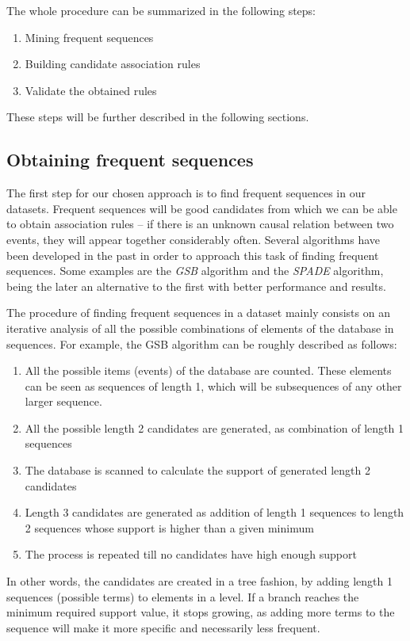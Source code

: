 \documentclass[a4paper,12pt]{article}
\begin{document}
The whole procedure can be summarized in the following steps:
\begin{enumerate}
\item Mining frequent sequences
\item Building candidate association rules
\item Validate the obtained rules
\end{enumerate}

These steps will be further described in the following sections.

\subsection{Obtaining frequent sequences}
\label{sec:mining_sequences}
The first step for our chosen approach is to find frequent sequences in our datasets. Frequent sequences will be good candidates from which we can be able to obtain association rules -- if there is an unknown causal relation between two events, they will appear together considerably often. Several algorithms have been developed in the past in order to approach this task of finding frequent sequences. Some examples are the \emph{GSB} algorithm and the \emph{SPADE} algorithm, being the later an alternative to the first with better performance and results.

The procedure of finding frequent sequences in a dataset mainly consists on an iterative analysis of all the possible combinations of elements of the database in sequences. For example, the GSB algorithm can be roughly described as follows:

\begin{enumerate}
\item All the possible items (events) of the database are counted. These elements can be seen as sequences of length 1, which will be subsequences of any other larger sequence.
\item All the possible length 2 candidates are generated, as combination of length 1 sequences
\item The database is scanned to calculate the support of generated length 2 candidates
\item Length 3 candidates are generated as addition of length 1 sequences to length 2 sequences whose support is higher than a given minimum
\item The process is repeated till no candidates have high enough support
\end{enumerate}

In other words, the candidates are created in a tree fashion, by adding length 1 sequences (possible terms) to elements in a level. If a branch reaches the minimum required support value, it stops growing, as adding more terms to the sequence will make it more specific and necessarily less frequent.
\end{document}
